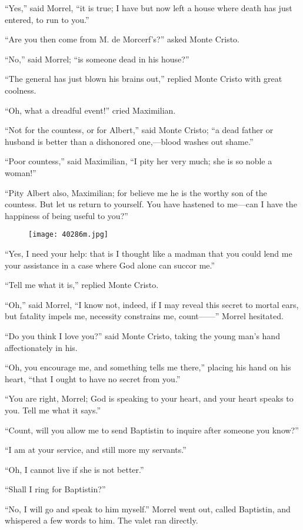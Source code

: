 “Yes,” said Morrel, “it is true; I have but now left a house where
death has just entered, to run to you.”

“Are you then come from M. de Morcerf’s?” asked Monte Cristo.

“No,” said Morrel; “is someone dead in his house?”

“The general has just blown his brains out,” replied Monte Cristo with
great coolness.

“Oh, what a dreadful event!” cried Maximilian.

“Not for the countess, or for Albert,” said Monte Cristo; “a dead
father or husband is better than a dishonored one,—blood washes out
shame.”

“Poor countess,” said Maximilian, “I pity her very much; she is so
noble a woman!”

“Pity Albert also, Maximilian; for believe me he is the worthy son of
the countess. But let us return to yourself. You have hastened to
me—can I have the happiness of being useful to you?”

\begin{figure}[ht]
\texttt{[image: 40286m.jpg]}
\end{figure}

“Yes, I need your help: that is I thought like a madman that you could
lend me your assistance in a case where God alone can succor me.”

“Tell me what it is,” replied Monte Cristo.

“Oh,” said Morrel, “I know not, indeed, if I may reveal this secret to
mortal ears, but fatality impels me, necessity constrains me, count——”
Morrel hesitated.

“Do you think I love you?” said Monte Cristo, taking the young man’s
hand affectionately in his.

“Oh, you encourage me, and something tells me there,” placing his hand
on his heart, “that I ought to have no secret from you.”

“You are right, Morrel; God is speaking to your heart, and your heart
speaks to you. Tell me what it says.”

“Count, will you allow me to send Baptistin to inquire after someone
you know?”

“I am at your service, and still more my servants.”

“Oh, I cannot live if she is not better.”

“Shall I ring for Baptistin?”

“No, I will go and speak to him myself.” Morrel went out, called
Baptistin, and whispered a few words to him. The valet ran directly.


